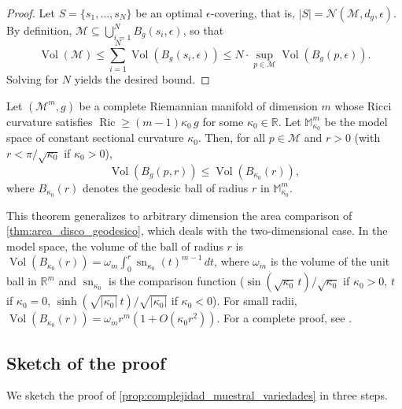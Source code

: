 \begin{proof}
Let $S = \{s_1, \ldots, s_N\}$ be an optimal $\epsilon$-covering, that is, $|S| = \mathcal{N}(\mathcal{M}, d_g, \epsilon)$. By definition, $\mathcal{M} \subseteq \bigcup_{i=1}^N B_g(s_i, \epsilon)$, so that
\[
\operatorname{Vol}(\mathcal{M}) \leq \sum_{i=1}^N \operatorname{Vol}(B_g(s_i, \epsilon)) \leq N \cdot \sup_{p \in \mathcal{M}} \operatorname{Vol}(B_g(p, \epsilon)).
\]
Solving for $N$ yields the desired bound.
\end{proof}

\begin{theorem}\label{thm:bishop_gunther}
Let $(\mathcal{M}^m, g)$ be a complete Riemannian manifold of dimension $m$ whose Ricci curvature satisfies $\operatorname{Ric} \geq (m-1)\kappa_0 \, g$ for some $\kappa_0 \in \mathbb{R}$. Let $\mathbb{M}^m_{\kappa_0}$ be the model space of constant sectional curvature $\kappa_0$. Then, for all $p \in \mathcal{M}$ and $r > 0$ (with $r < \pi/\sqrt{\kappa_0}$ if $\kappa_0 > 0$),
\[
\operatorname{Vol}(B_g(p, r)) \leq \operatorname{Vol}(B_{\kappa_0}(r)),
\]
where $B_{\kappa_0}(r)$ denotes the geodesic ball of radius $r$ in $\mathbb{M}^m_{\kappa_0}$.
\end{theorem}

\begin{remark}\label{rem:bishop_gunther_contexto}
This theorem generalizes to arbitrary dimension the area comparison of \autoref{thm:area_disco_geodesico}, which deals with the two-dimensional case. In the model space, the volume of the ball of radius $r$ is $\operatorname{Vol}(B_{\kappa_0}(r)) = \omega_m \int_0^r \operatorname{sn}_{\kappa_0}(t)^{m-1} \, dt$, where $\omega_m$ is the volume of the unit ball in $\mathbb{R}^m$ and $\operatorname{sn}_{\kappa_0}$ is the comparison function ($\sin(\sqrt{\kappa_0}\,t)/\sqrt{\kappa_0}$ if $\kappa_0 > 0$, $t$ if $\kappa_0 = 0$, $\sinh(\sqrt{|\kappa_0|}\,t)/\sqrt{|\kappa_0|}$ if $\kappa_0 < 0$). For small radii, $\operatorname{Vol}(B_{\kappa_0}(r)) = \omega_m r^m (1 + O(\kappa_0 r^2))$. For a complete proof, see \citet[Theorem~11.10]{lee2018introduction}.
\end{remark}

\subsection{Sketch of the proof}\label{subsec:complejidad_muestral_demo}

We sketch the proof of \autoref{prop:complejidad_muestral_variedades} in three steps.

